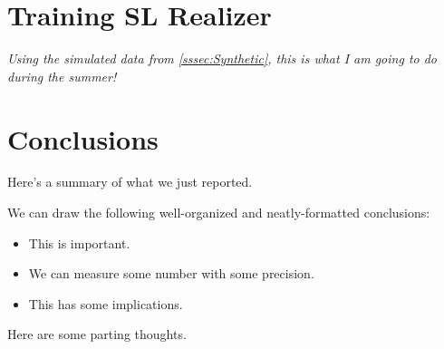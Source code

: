 \documentclass[\docopts]{\docclass}
\begin{document}
\section{Training SL Realizer}
\label{sec:sl_realizer_train}

\textit{Using the simulated data from \ref{sssec:Synthetic}, this is what I am going to do during the summer! }


\section{Conclusions}
\label{sec:conclusions}

Here's a summary of what we just reported.

We can draw the following well-organized and neatly-formatted conclusions:
\begin{itemize}
  \item This is important.
  \item We can measure some number with some precision.
  \item This has some implications.
\end{itemize}

Here are some parting thoughts.
\end{document}
